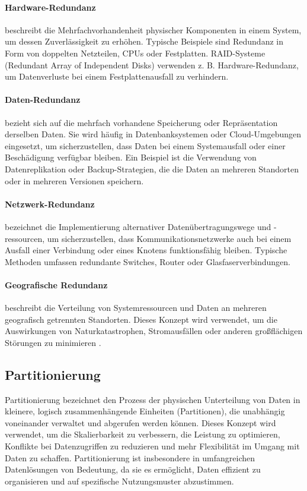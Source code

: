     \paragraph{Hardware-Redundanz} beschreibt die Mehrfachvorhandenheit physischer Komponenten in einem System, um dessen Zuverlässigkeit zu erhöhen. Typische Beispiele sind Redundanz in Form von doppelten Netzteilen, CPUs oder Festplatten. RAID-Systeme (Redundant Array of Independent Disks) verwenden z. B. Hardware-Redundanz, um Datenverluste bei einem Festplattenausfall zu verhindern.
    \paragraph{Daten-Redundanz} bezieht sich auf die mehrfach vorhandene Speicherung oder Repräsentation derselben Daten. Sie wird häufig in Datenbanksystemen oder Cloud-Umgebungen eingesetzt, um sicherzustellen, dass Daten bei einem Systemausfall oder einer Beschädigung verfügbar bleiben. Ein Beispiel ist die Verwendung von Datenreplikation oder Backup-Strategien, die die Daten an mehreren Standorten oder in mehreren Versionen speichern.
    \paragraph{Netzwerk-Redundanz} bezeichnet die Implementierung alternativer Datenübertragungswege und -ressourcen, um sicherzustellen, dass Kommunikationsnetzwerke auch bei einem Ausfall einer Verbindung oder eines Knotens funktionsfähig bleiben. Typische Methoden umfassen redundante Switches, Router oder Glasfaserverbindungen. 
    \paragraph{Geografische Redundanz} beschreibt die Verteilung von Systemressourcen und Daten an mehreren geografisch getrennten Standorten. Dieses Konzept wird verwendet, um die Auswirkungen von Naturkatastrophen, Stromausfällen oder anderen großflächigen Störungen zu minimieren \cite{g4g-redundancy}.


\subsection{Partitionierung}

Partitionierung bezeichnet den Prozess der physischen Unterteilung von Daten in kleinere, logisch zusammenhängende Einheiten (Partitionen), die unabhängig voneinander verwaltet und abgerufen werden können. Dieses Konzept wird verwendet, um die Skalierbarkeit zu verbessern, die Leistung zu optimieren, Konflikte bei Datenzugriffen zu reduzieren und mehr Flexibilität im Umgang mit Daten zu schaffen. Partitionierung ist insbesondere in umfangreichen Datenlösungen von Bedeutung, da sie es ermöglicht, Daten effizient zu organisieren und auf spezifische Nutzungsmuster abzustimmen.


